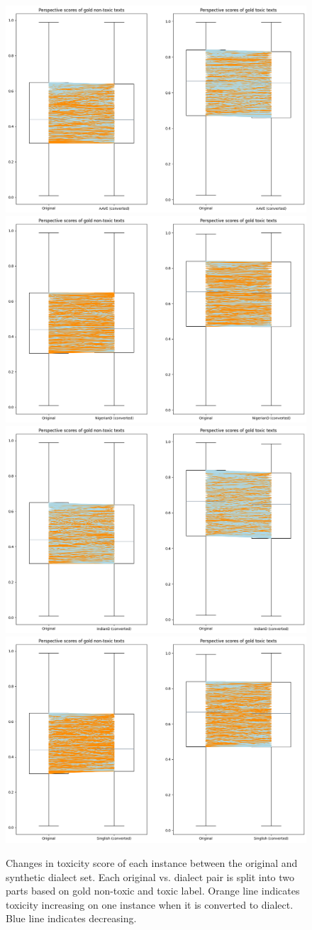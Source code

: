 \documentclass[11pt]{article}
\begin{document}
\begin{figure}[t]
  \includegraphics[width=0.48\linewidth]{figs-misc/AAVE-changes.png}\hfill
  \includegraphics[width=0.48\linewidth]{figs-misc/NigerianD-changes.png}\bigbreak
  \includegraphics[width=0.48\linewidth]{figs-misc/IndianD-changes.png}\hfill
  \includegraphics[width=0.48\linewidth]{figs-misc/Singlish-changes.png}
  \caption{Changes in toxicity score of each instance between the original and synthetic dialect set. Each original vs. dialect pair is split into two parts based on gold non-toxic and toxic label. Orange line indicates toxicity increasing on one instance when it is converted to dialect. Blue line indicates decreasing.}
  \label{q2-q3}
\end{figure}
\end{document}
